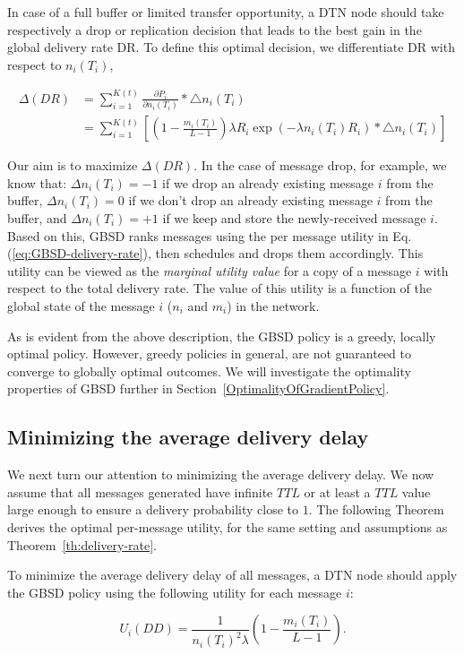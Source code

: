 In case of a full buffer or limited transfer opportunity, a
DTN node should take respectively a drop or replication decision that leads to the best gain in the global delivery rate DR. To define this optimal decision, we differentiate DR with respect to $n_i(T_i)$,

\small
\begin{align*}
\Delta(DR) &= \sum_{i=1}^{K(t)}{\frac{\partial P_i}{\partial n_i(T_i)} * \bigtriangleup n_i(T_i)}
\\&= \sum_{i=1}^{K(t)} \left[{(1-\frac{m_i(T_i)}{L-1})\lambda R_i\exp(-\lambda n_i(T_i) R_i) * \bigtriangleup n_i(T_i)}\right]
\end{align*}
\normalsize

Our aim is to maximize $\Delta(DR)$. In the case of message drop, for example, we know that: $\Delta n_i(T_i) = -1$ if we drop an already existing message $i$ from the buffer, $\Delta n_i(T_i) = 0$ if we don't drop an already existing message $i$ from the buffer, and $\Delta n_i(T_i) = +1$ if we keep and store the newly-received message $i$. Based on this, GBSD ranks messages using the per message utility in Eq.(\ref{eq:GBSD-delivery-rate}), then schedules and drops them accordingly. This utility can be viewed as the \emph{marginal utility value} for a copy of a message $i$ with respect to the total delivery rate. The value of this utility is a function of the global state of the message $i$ ($n_i$ and $m_i$) in the network.

As is evident from the above description, the GBSD policy is a greedy, locally optimal policy. However, greedy policies in general, are not guaranteed to converge to globally optimal outcomes. We will investigate the optimality properties of GBSD further in Section~\ref{OptimalityOfGradientPolicy}.

\subsection{Minimizing the average delivery delay}
\label{subsec:MinAvgDeliveryDelay}


We next turn our attention to minimizing the average delivery delay. We now assume that all messages generated have infinite $TTL$ or at least a $TTL$ value large enough to ensure a delivery probability close to $1$. The following
Theorem derives the optimal per-message utility, for
the same setting and assumptions as Theorem~\ref{th:delivery-rate}.

\begin{theorem} \label{th:delivery-delay}
To minimize the average delivery delay of all
messages, a DTN node should apply the GBSD policy using
the following utility for each message $i$:

\begin{equation}\label{eq:delivery-delay}
U_{i}(DD) = \frac{1}{n_i(T_i)^2 \lambda} ( 1-\frac{m_i(T_i)}{L-1}). \end{equation}
\end{theorem}


